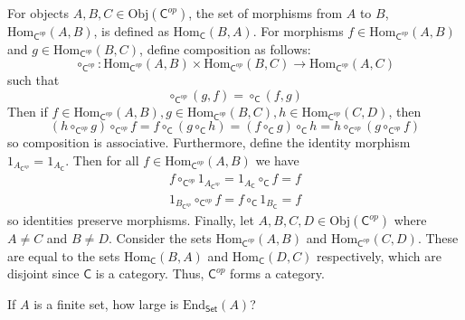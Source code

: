 \documentclass[../../master.tex]{subfiles}
\begin{document}
  \begin{solution}
    For objects \(A, B, C \in \text{Obj}(\mathsf{C}^{op})\), the set of morphisms from \(A\) to \(B\), \(\text{Hom}_{\mathsf{C}^{op}}(A, B)\), is defined as \(\text{Hom}_{\mathsf{C}}(B, A)\).
    For morphisms \(f \in \text{Hom}_{\mathsf{C}^{op}}(A, B)\) and \(g \in \text{Hom}_{\mathsf{C}^{op}}(B, C)\), define composition as follows:
    \begin{equation*}
      \circ_{\mathsf{C}^{op}}: \text{Hom}_{\mathsf{C}^{op}}(A, B) \times \text{Hom}_{\mathsf{C}^{op}}(B, C) \to \text{Hom}_{\mathsf{C}^{op}}(A, C)
    \end{equation*}
    such that
    \begin{equation*}
      \circ_{\mathsf{C}^{op}}(g, f) = \circ_{\mathsf{C}}(f, g)
    \end{equation*}
    Then if \(f \in \text{Hom}_{\mathsf{C}^{op}}(A, B), g \in \text{Hom}_{\mathsf{C}^{op}}(B, C), h \in \text{Hom}_{\mathsf{C}^{op}}(C, D)\), then
    \begin{equation*}
      (h \circ_{\mathsf{C}^{op}} g) \circ_{\mathsf{C}^{op}} f = f \circ_{\mathsf{C}} (g \circ_{\mathsf{C}} h) = (f \circ_{\mathsf{C}} g) \circ_{\mathsf{C}} h = h \circ_{\mathsf{C}^{op}} (g \circ_{\mathsf{C}^{op}} f)
    \end{equation*}
    so composition is associative.
    Furthermore, define the identity morphism \(1_{A_{\mathsf{C}^{op}}} = 1_{A_{\mathsf{C}}}\).
    Then for all \(f \in \text{Hom}_{\mathsf{C}^{op}}(A, B)\) we have
    \begin{gather*}
      f \circ_{\mathsf{C}^{op}} 1_{A_{\mathsf{C}^{op}}} = 1_{A_{\mathsf{C}}} \circ_{\mathsf{C}} f = f \\
      1_{B_{\mathsf{C}^{op}}} \circ_{\mathsf{C}^{op}} f = f \circ_{\mathsf{C}} 1_{B_{\mathsf{C}}} = f
    \end{gather*}
    so identities preserve morphisms.
    Finally, let \(A, B, C, D \in \text{Obj}(\mathsf{C}^{op})\) where \(A \neq C\) and \(B \neq D\).
    Consider the sets \(\text{Hom}_{\mathsf{C}^{op}} (A, B)\) and \(\text{Hom}_{\mathsf{C}^{op}} (C, D)\).
    These are equal to the sets \(\text{Hom}_{\mathsf{C}} (B, A)\) and \(\text{Hom}_{\mathsf{C}} (D, C)\) respectively, which are disjoint since \(\mathsf{C}\) is a category.
    Thus, \(\mathsf{C}^{op}\) forms a category.
  \end{solution}

  \begin{problem}
    If \(A\) is a finite set, how large is \(\text{End}_{\mathsf{Set}}(A)\)?
  \end{problem}
\end{document}
